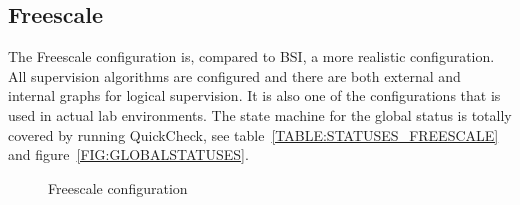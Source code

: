 \subsection{Freescale}
The Freescale configuration is, compared to BSI, a more realistic configuration.
All supervision algorithms are configured and there are both external and
internal graphs for logical supervision. It is also one of the configurations
that is used in actual lab environments. The state machine for the global
status is totally covered by running QuickCheck, see
table~\ref{TABLE:STATUSES_FREESCALE} and figure~\ref{FIG:GLOBALSTATUSES}.

\begin{figure}[h!]
  \begin{center}
  \end{center}
  \caption{Freescale configuration}
  \label{FIG:FREESCALE}
\end{figure}

